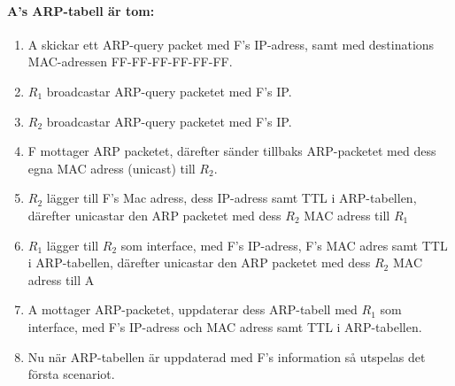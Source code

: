 \paragraph{A's ARP-tabell är tom:}
\begin{enumerate}
    \item A skickar ett ARP-query packet med F's IP-adress, samt med destinations
	MAC-adressen FF-FF-FF-FF-FF-FF.
    \item $R_1$ broadcastar ARP-query packetet med F's IP.
    \item $R_2$ broadcastar ARP-query packetet med F's IP.
    \item  F mottager ARP packetet, därefter sänder tillbaks ARP-packetet med dess egna MAC
	adress (unicast) till $R_2$.
    \item $R_2$ lägger till F's Mac adress, dess IP-adress samt TTL i ARP-tabellen, därefter unicastar den
	ARP packetet med dess $R_2$ MAC adress till $R_1$

    \item $R_1$ lägger till $R_2$ som interface, med F's IP-adress, F's MAC adres samt TTL i ARP-tabellen, därefter unicastar den
	ARP packetet med dess $R_2$ MAC adress till A
    \item A mottager ARP-packetet, uppdaterar dess ARP-tabell med $R_1$ som interface, med F's
	IP-adress och MAC adress samt TTL i ARP-tabellen.

    \item Nu när ARP-tabellen är uppdaterad med F's information så utspelas det första scenariot.
\end{enumerate}
